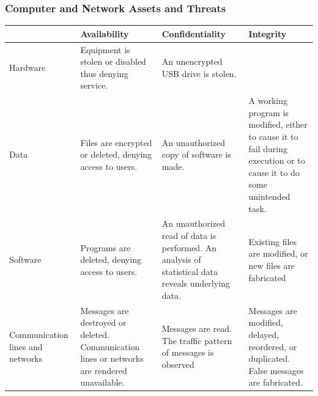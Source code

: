 \documentclass{article}
\begin{document}
            \subsubsection{Computer and Network Assets and Threats}
                    \begin{table}[h]
                    \begin{tabular}{|p{3cm}|p{4cm}|p{4cm}|p{4cm}|}
                    \hline
                    \rowcolor[HTML]{34CDF9} 
                                                    & \textbf{Availability}                                 & \textbf{Confidentiality} & \textbf{Integrity} \\ \hline
                    Hardware                         & Equipment is stolen or disabled thus denying service. & An unencrypted USB drive is stolen.&                    \\ \hline
                    Data                             & Files are encrypted or deleted, denying access to users. &    An unauthorized copy of software is made. & A working program is modified, either to cause it to fail during execution or to cause it to do some unintended task.                  \\ \hline
                    Software                         & Programs are deleted, denying access to users. & An unauthorized read of data is performed. An analysis of statistical data reveals underlying data. & Existing files are modified, or new files are fabricated                    \\ \hline
                    Communication lines and networks & Messages are destroyed or deleted. Communication lines or networks are rendered unavailable. & Messages are read. The traffic pattern of messages is observed & Messages are modified, delayed, reordered, or duplicated. False messages are fabricated.                   \\ \hline
                    \end{tabular}
                    \end{table}
\end{document}
